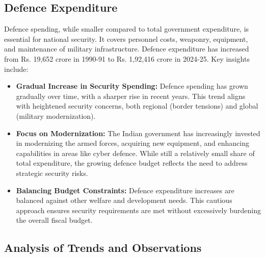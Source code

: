 \documentclass[a4paper,12pt]{extarticle} %
\begin{document}
\subsection{Defence Expenditure}
Defence spending, while smaller compared to total government expenditure, is essential for national security. It covers personnel costs, weaponry, equipment, and maintenance of military infrastructure. Defence expenditure has increased from Rs. 19,652 crore in 1990-91 to Rs. 1,92,416 crore in 2024-25. Key insights include:

\begin{itemize}
    \item \textbf{Gradual Increase in Security Spending:} Defence spending has grown gradually over time, with a sharper rise in recent years. This trend aligns with heightened security concerns, both regional (border tensions) and global (military modernization).
    \item \textbf{Focus on Modernization:} The Indian government has increasingly invested in modernizing the armed forces, acquiring new equipment, and enhancing capabilities in areas like cyber defence. While still a relatively small share of total expenditure, the growing defence budget reflects the need to address strategic security risks.
    \item \textbf{Balancing Budget Constraints:} Defence expenditure increases are balanced against other welfare and development needs. This cautious approach ensures security requirements are met without excessively burdening the overall fiscal budget.
\end{itemize}

\subsection{Analysis of Trends and Observations}
\end{document}
